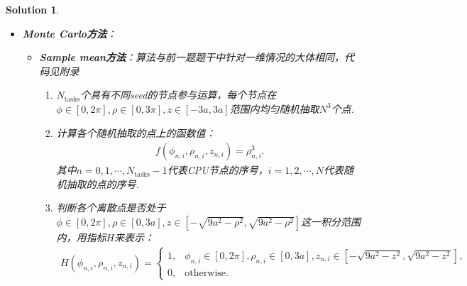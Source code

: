 \documentclass[UTF8,10pt,a4paper]{article}
\theoremstyle{Problem}
\theoremstyle{Solution}
\newtheorem*{sol}{Solution}
\begin{document}
\begin{sol}
\begin{itemize}
\begin{enumerate}
\begin{align}
\begin{array}{ll}
                    1,&\phi_i\in[0,2\pi],\rho_j\in[0,3a],z_k\in[-\sqrt{9a^2-z^2},\sqrt{9a^2-z^2}],\\
                    0,&\text{otherwise}.
                \end{array}\right.
            \end{align}
            \item 将所有处于积分范围内的离散点上的函数值求和取平均并乘上积分范围的体积，得到数值积分结果：
            \begin{align}
                I\approx\left(\frac{2\pi-0}{N}\right)\left(\frac{3a-0}{N}\right)\left(\frac{3a-(-3a)}{N}\right)\sum_{i=1}^{N}\sum_{j=1}^{N}\sum_{k=1}^{N}f(\phi_i,\rho_j,z_k)H(\phi_i,\rho_j,z_k).
            \end{align}
            \item 用CPU\_TIME来得到各个节点的计算耗时，将所有节点的计算耗时加和得到计算总耗时，将计算结果与积分的准确值$\frac{648\pi}{5}a^3$做差得到计算误差.
        \end{enumerate}
        \item \textbf{Monte Carlo方法}：
        \begin{itemize}
            \item \textbf{Sample mean方法}：算法与前一题题干中针对一维情况的大体相同，代码见附录
            \begin{enumerate}
                \item $N_{\text{tasks}}$个具有不同seed的节点参与运算，每个节点在$\phi\in[0,2\pi],\rho\in[0,3\pi],z\in[-3a,3a]$范围内均匀随机抽取$N^3$个点.
                \item 计算各个随机抽取的点上的函数值：
                \begin{align}
                    f(\phi_{n,i},\rho_{n,i},z_{n,i})=\rho_{n,i}^3.
                \end{align}
                其中$n=0,1,\cdots,N_{\text{tasks}}-1$代表CPU节点的序号，$i=1,2,\cdots,N$代表随机抽取的点的序号.
                \item 判断各个离散点是否处于$\phi\in[0,2\pi],\rho\in[0,3a],z\in[-\sqrt{9a^2-\rho^2},\sqrt{9a^2-\rho^2}]$这一积分范围内，用指标$H$来表示：
                \begin{align}
                    H(\phi_{n,i},\rho_{n,i},z_{n,i})=\left\{\begin{array}{ll}
                        1,&\phi_{n,i}\in[0,2\pi],\rho_{n,i}\in[0,3a],z_{n,i}\in[-\sqrt{9a^2-z^2},\sqrt{9a^2-z^2}],\\
                        0,&\text{otherwise}.
                    \end{array}\right.

\end{align}
\end{enumerate}
\end{itemize}
\end{itemize}
\end{sol}
\end{document}
